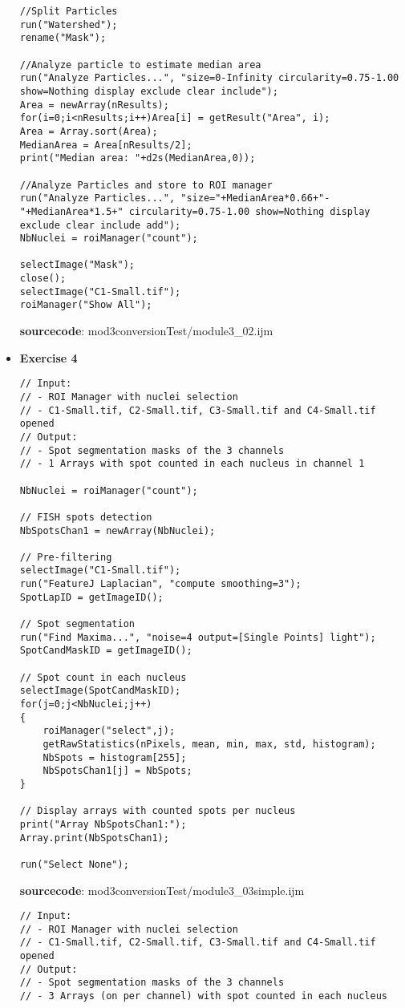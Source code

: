 \begin{itemize}
\begin{lstlisting}
//Split Particles
run("Watershed");
rename("Mask");

//Analyze particle to estimate median area
run("Analyze Particles...", "size=0-Infinity circularity=0.75-1.00 show=Nothing display exclude clear include"); 
Area = newArray(nResults);
for(i=0;i<nResults;i++)Area[i] = getResult("Area", i);
Area = Array.sort(Area);
MedianArea = Area[nResults/2];
print("Median area: "+d2s(MedianArea,0));

//Analyze Particles and store to ROI manager
run("Analyze Particles...", "size="+MedianArea*0.66+"-"+MedianArea*1.5+" circularity=0.75-1.00 show=Nothing display exclude clear include add");
NbNuclei = roiManager("count");

selectImage("Mask");
close();
selectImage("C1-Small.tif");
roiManager("Show All");
\end{lstlisting}
\textbf{sourcecode}: mod3conversionTest/module3_02.ijm
\item \textbf{Exercise 4}

\begin{lstlisting}
// Input: 
// - ROI Manager with nuclei selection
// - C1-Small.tif, C2-Small.tif, C3-Small.tif and C4-Small.tif opened
// Output: 
// - Spot segmentation masks of the 3 channels
// - 1 Arrays with spot counted in each nucleus in channel 1

NbNuclei = roiManager("count");

// FISH spots detection
NbSpotsChan1 = newArray(NbNuclei);

// Pre-filtering
selectImage("C1-Small.tif");
run("FeatureJ Laplacian", "compute smoothing=3");
SpotLapID = getImageID();
	
// Spot segmentation
run("Find Maxima...", "noise=4 output=[Single Points] light");
SpotCandMaskID = getImageID();
	
// Spot count in each nucleus
selectImage(SpotCandMaskID);
for(j=0;j<NbNuclei;j++)
{ 	
	roiManager("select",j);
	getRawStatistics(nPixels, mean, min, max, std, histogram);
	NbSpots = histogram[255];
	NbSpotsChan1[j] = NbSpots;
}

// Display arrays with counted spots per nucleus
print("Array NbSpotsChan1:");
Array.print(NbSpotsChan1);

run("Select None");
\end{lstlisting}
\textbf{sourcecode}: mod3conversionTest/module3_03simple.ijm

\begin{lstlisting}
// Input: 
// - ROI Manager with nuclei selection
// - C1-Small.tif, C2-Small.tif, C3-Small.tif and C4-Small.tif opened
// Output: 
// - Spot segmentation masks of the 3 channels
// - 3 Arrays (on per channel) with spot counted in each nucleus


\end{lstlisting}
\end{itemize}
